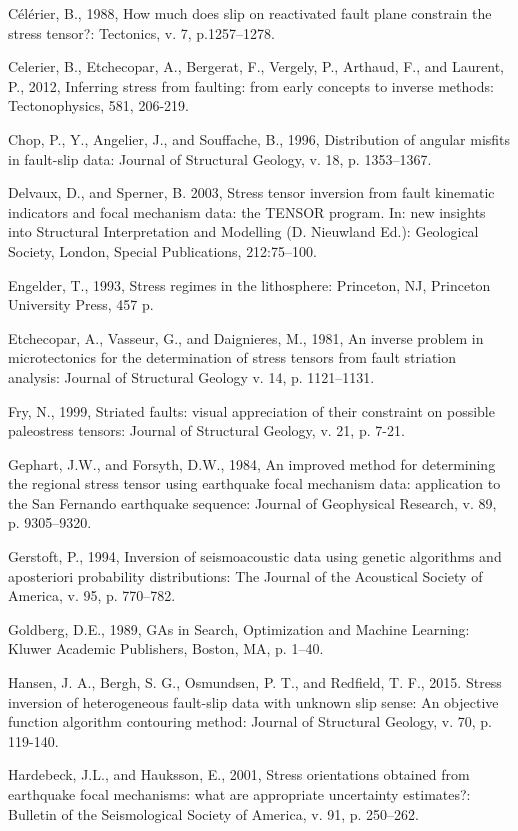 {\begin{hangparas}{.25in}{1}
    Célérier, B., 1988, How much does slip on reactivated fault plane constrain the stress tensor?: Tectonics, v. 7, p.1257–1278.
    
    Celerier, B., Etchecopar, A., Bergerat, F., Vergely, P., Arthaud, F., and Laurent, P., 2012, Inferring stress from faulting: from early concepts to inverse methods: Tectonophysics, 581, 206-219.

    Chop, P., Y., Angelier, J., and Souffache, B., 1996, Distribution of angular misfits in fault-slip data: Journal of Structural Geology, v. 18, p. 1353–1367.

    Delvaux, D., and Sperner, B. 2003, Stress tensor inversion from fault kinematic indicators and focal mechanism data: the TENSOR program. In: new insights into Structural Interpretation and Modelling (D. Nieuwland Ed.): Geological Society, London, Special Publications, 212:75–100.

    Engelder, T., 1993, Stress regimes in the lithosphere: Princeton, NJ, Princeton University Press, 457 p.

    Etchecopar, A., Vasseur, G., and Daignieres, M., 1981, An inverse problem in microtectonics for the determination of stress tensors from fault striation analysis: Journal of Structural Geology v. 14, p. 1121–1131.
    
    Fry, N., 1999, Striated faults: visual appreciation of their constraint on possible paleostress tensors: Journal of Structural Geology, v. 21, p. 7-21. 

    Gephart, J.W., and Forsyth, D.W., 1984, An improved method for determining the regional stress tensor using earthquake focal mechanism data: application to the San Fernando earthquake sequence: Journal of Geophysical Research, v. 89, p. 9305–9320.

    Gerstoft, P., 1994, Inversion of seismoacoustic data using genetic algorithms and aposteriori probability distributions: The Journal of the Acoustical Society of America, v. 95, p. 770–782.

    Goldberg, D.E., 1989, GAs in Search, Optimization and Machine Learning: Kluwer Academic Publishers, Boston, MA, p. 1–40.
    
    Hansen, J. A., Bergh, S. G., Osmundsen, P. T., and Redfield, T. F., 2015. Stress inversion of heterogeneous fault-slip data with unknown slip sense: An objective function algorithm contouring method: Journal of Structural Geology, v. 70, p. 119-140.

    Hardebeck, J.L., and Hauksson, E., 2001, Stress orientations obtained from earthquake focal mechanisms: what are appropriate uncertainty estimates?: Bulletin of the Seismological Society of America, v. 91, p. 250–262.


\end{hangparas}}
